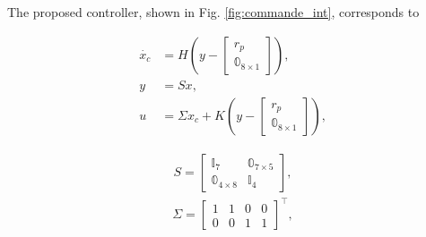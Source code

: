 The proposed controller, shown in Fig. \ref{fig:commande_int},  corresponds to 
\begin{minipage}[t]{0.58\columnwidth}
    \begin{align}
        \dot{x_{c}} &= H(y-\begin{bmatrix}r_{p}\\\mathbb{0}_{8\times 1} \end{bmatrix}),\\
        y &= S x,\\
        u &= \Sigma x_{c} + K(y-\begin{bmatrix}r_{p}\\\mathbb{0}_{8\times 1} \end{bmatrix}),
    \end{align}
\end{minipage}
\begin{minipage}[t]{0.42\columnwidth}
    \begin{align}
        S =\begin{bmatrix} \mathbb{I}_{7} &  \mathbb{0}_{7\times 5} \\
         \mathbb{0}_{4\times 8} &  \mathbb{I}_{4}
          \end{bmatrix}, 
    \end{align}
    \begin{align}
        \Sigma = \begin{bmatrix} 1 & 1 & 0 & 0\\ 0 & 0 & 1 & 1\end{bmatrix}^\top,
    \end{align}
\end{minipage}

